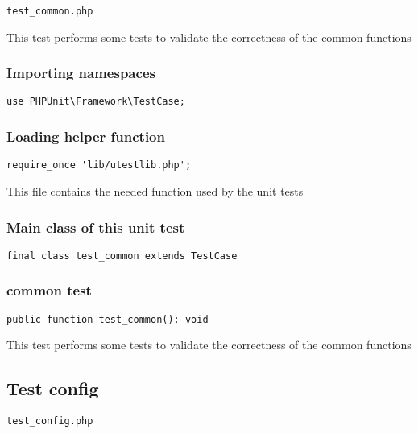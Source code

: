 \documentclass[a4paper]{article}
\begin{document}
\begin{lstlisting}
test_common.php
\end{lstlisting}

This test performs some tests to validate the correctness
of the common functions

\hypertarget{toc89}{}
\subsubsection{Importing namespaces}

\begin{lstlisting}
use PHPUnit\Framework\TestCase;
\end{lstlisting}

\hypertarget{toc90}{}
\subsubsection{Loading helper function}

\begin{lstlisting}
require_once 'lib/utestlib.php';
\end{lstlisting}

This file contains the needed function used by the unit tests

\hypertarget{toc91}{}
\subsubsection{Main class of this unit test}

\begin{lstlisting}
final class test_common extends TestCase
\end{lstlisting}

\hypertarget{toc92}{}
\subsubsection{common test}

\begin{lstlisting}
public function test_common(): void
\end{lstlisting}

This test performs some tests to validate the correctness
of the common functions

\hypertarget{toc93}{}
\subsection{Test config}

\begin{lstlisting}
test_config.php
\end{lstlisting}
\end{document}
